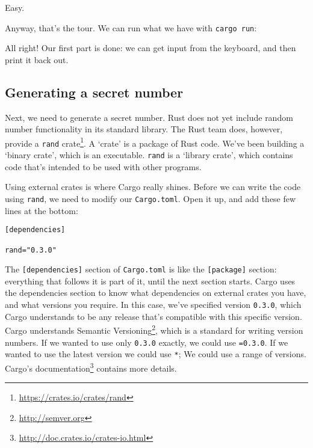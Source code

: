 \documentclass[a4paper,]{book}
\newenvironment{Shaded}{\begin{snugshade}}{\end{snugshade}}
\newcommand{\KeywordTok}[1]{\textcolor[rgb]{0.13,0.29,0.53}{\textbf{{#1}}}}
\newcommand{\NormalTok}[1]{{#1}}
\renewcommand{\href}[2]{#2\footnote{\url{#1}}}
\begin{document}
Easy.

Anyway, that's the tour. We can run what we have with
\texttt{cargo\ run}:

\begin{Shaded}
\end{Shaded}

All right! Our first part is done: we can get input from the keyboard,
and then print it back out.

\subsection{Generating a secret
number}\label{generating-a-secret-number}

Next, we need to generate a secret number. Rust does not yet include
random number functionality in its standard library. The Rust team does,
however, provide a \href{https://crates.io/crates/rand}{\texttt{rand}
crate}. A `crate' is a package of Rust code. We've been building a
`binary crate', which is an executable. \texttt{rand} is a `library
crate', which contains code that's intended to be used with other
programs.

Using external crates is where Cargo really shines. Before we can write
the code using \texttt{rand}, we need to modify our \texttt{Cargo.toml}.
Open it up, and add these few lines at the bottom:

\begin{verbatim}
[dependencies]

rand="0.3.0"
\end{verbatim}

The \texttt{{[}dependencies{]}} section of \texttt{Cargo.toml} is like
the \texttt{{[}package{]}} section: everything that follows it is part
of it, until the next section starts. Cargo uses the dependencies
section to know what dependencies on external crates you have, and what
versions you require. In this case, we've specified version
\texttt{0.3.0}, which Cargo understands to be any release that's
compatible with this specific version. Cargo understands
\href{http://semver.org}{Semantic Versioning}, which is a standard for
writing version numbers. If we wanted to use only \texttt{0.3.0}
exactly, we could use \texttt{=0.3.0}. If we wanted to use the latest
version we could use \texttt{*}; We could use a range of versions.
\href{http://doc.crates.io/crates-io.html}{Cargo's documentation}
contains more details.
\end{document}
